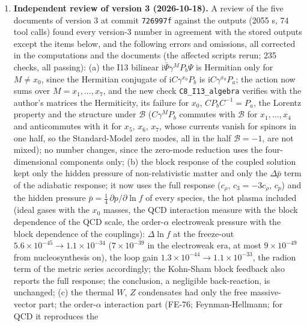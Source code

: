 \documentclass[
  10pt,
]{article}
\begin{document}
\begin{enumerate}
  could give the relic only as a strongly coupled channel at the
  unitarity limit; (h) in MODEL a cross-reference to the neutrino
  decoupling pointed to section 9.4 instead of 10.4 (since version 2).
\item
  \textbf{Independent review of version 3 (2026-10-18).} A review of the
  five documents of version 3 at commit \texttt{726997f} against the
  outputs (2055 s, 74 tool calls) found every version-3 number in
  agreement with the stored outputs except the items below, and the
  following errors and omissions, all corrected in the computations and
  the documents (the affected scripts rerun; 235 checks, all passing):
  (a) the I13 bilinear \(\mathrm{i}\bar\Psi\gamma^MP_b\Psi\) is
  Hermitian only for \(M \ne x_0\), since the Hermitian conjugate of
  \(\mathrm{i}C\gamma^{x_0}P_b\) is \(\mathrm{i}C\gamma^{x_0}P_a\); the
  action now sums over \(M = x_1, \dots, x_7\), and the new check
  \texttt{C8\_I13\_algebra} verifies with the author's matrices the
  Hermiticity, its failure for \(x_0\), \(CP_bC^{-1} = P_a\), the
  Lorentz property and the structure under \(\mathcal{B}\)
  (\(C\gamma^MP_b\) commutes with \(\mathcal{B}\) for
  \(x_1, \dots, x_4\) and anticommutes with it for \(x_5\), \(x_6\),
  \(x_7\), whose currents vanish for spinors in one half, so the
  Standard-Model zero modes, all in the half \(\mathcal{B} = -1\), are
  not mixed); no number changes, since the zero-mode reduction uses the
  four-dimensional components only; (b) the block response of the
  coupled solution kept only the hidden pressure of non-relativistic
  matter and only the \(\Delta\bar p\) term of the adiabatic response;
  it now uses the full response (\(c_\rho\), \(c_3 = -3c_\rho\),
  \(c_p\)) and the hidden pressure
  \(\bar p = \frac14\,\partial p/\partial\ln f\) of every species, the
  hot plasma included (ideal gases with the \(x_0\) masses, the QCD
  interaction measure with the block dependence of the QCD scale, the
  order-\(\alpha\) electroweak pressure with the block dependence of the
  couplings): \(\Delta\ln f\) at the freeze-out
  \(5.6\times10^{-45} \to 1.1\times10^{-34}\) (\(7\times10^{-39}\) in
  the electroweak era, at most \(9\times10^{-49}\) from nucleosynthesis
  on), the loop gain \(1.3\times10^{-44} \to 1.1\times10^{-33}\), the
  radion term of the metric series accordingly; the Kohn-Sham block
  feedback also reports the full response; the conclusion, a negligible
  back-reaction, is unchanged; (c) the thermal \(W\), \(Z\) condensates
  had only the free massive-vector part; the order-\(\alpha\)
  interaction part (FE-76; Feynman-Hellmann; for QCD it reproduces the

\end{enumerate}
\end{document}

